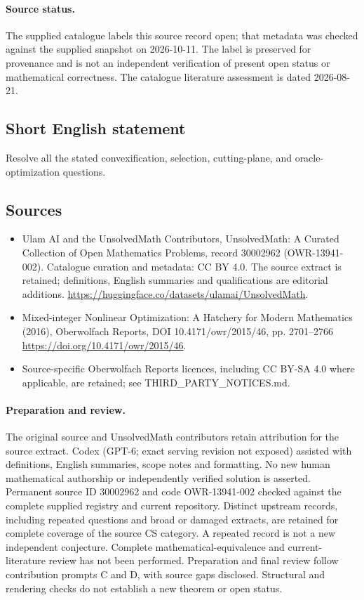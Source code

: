 \documentclass[11pt]{article}
\begin{document}
\paragraph{Source status.}
The supplied catalogue labels this source record open; that metadata was checked against the supplied snapshot on 2026-10-11. The label is preserved for provenance and is not an independent verification of present open status or mathematical correctness. The catalogue literature assessment is dated 2026-08-21.
\subsection{Short English statement}
Resolve all the stated convexification, selection, cutting-plane, and oracle-optimization questions.
\subsection{Sources}
\begin{itemize}
\item[\hypertarget{source:30002962:1}{S1}] Ulam AI and the UnsolvedMath Contributors, UnsolvedMath: A Curated Collection of Open Mathematics Problems, record 30002962 (OWR-13941-002). Catalogue curation and metadata: CC BY 4.0. The source extract is retained; definitions, English summaries and qualifications are editorial additions.
\url{https://huggingface.co/datasets/ulamai/UnsolvedMath}.
\item[\hypertarget{source:30002962:2}{S2}] Mixed-integer Nonlinear Optimization: A Hatchery for Modern Mathematics (2016), Oberwolfach Reports, DOI 10.4171/owr/2015/46, pp. 2701--2766
\url{https://doi.org/10.4171/owr/2015/46}.
\item Source-specific Oberwolfach Reports licences, including CC BY-SA 4.0 where applicable, are retained; see THIRD\_PARTY\_NOTICES.md.
\end{itemize}
\paragraph{Preparation and review.}
The original source and UnsolvedMath contributors retain attribution for the source extract. Codex (GPT-6; exact serving revision not exposed) assisted with definitions, English summaries, scope notes and formatting. No new human mathematical authorship or independently verified solution is asserted. Permanent source ID 30002962 and code OWR-13941-002 checked against the complete supplied registry and current repository. Distinct upstream records, including repeated questions and broad or damaged extracts, are retained for complete coverage of the source CS category. A repeated record is not a new independent conjecture. Complete mathematical-equivalence and current-literature review has not been performed. Preparation and final review follow contribution prompts C and D, with source gaps disclosed. Structural and rendering checks do not establish a new theorem or open status.
\label{end:30002962}
\end{document}
